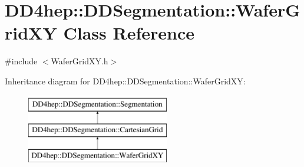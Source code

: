 \hypertarget{class_d_d4hep_1_1_d_d_segmentation_1_1_wafer_grid_x_y}{}\section{D\+D4hep\+:\+:D\+D\+Segmentation\+:\+:Wafer\+Grid\+XY Class Reference}
\label{class_d_d4hep_1_1_d_d_segmentation_1_1_wafer_grid_x_y}


{\ttfamily \#include $<$Wafer\+Grid\+X\+Y.\+h$>$}

Inheritance diagram for D\+D4hep\+:\+:D\+D\+Segmentation\+:\+:Wafer\+Grid\+XY\+:\begin{figure}[H]
\begin{center}
\leavevmode
\includegraphics[height=3.000000cm]{class_d_d4hep_1_1_d_d_segmentation_1_1_wafer_grid_x_y}
\end{center}
\end{figure}
